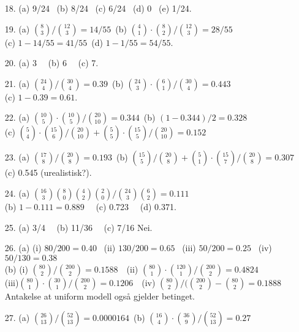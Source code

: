 \begin{itemize}
            (c)  $20\cdot 10!/12! = 5/33$  \ (d)  $12\cdot 10!/12! = 1/11.$
\item[18.]  (a)  9/24  \ (b)  8/24 \  (c)  6/24  \ (d)  0  \ (e)  1/24.
\item[19.]  (a)  ${8\choose 3}/{12\choose 3} = 14/55 $\
            (b)  ${4\choose 1}\cdot {8\choose 2}/{12\choose 3} = 28/55$\\
            (c)  $1-14/55 = 41/55$\    (d)  $1-1/55 = 54/55$.
\item[20.]  (a)  3   \ \ (b)  6 \ \   (c)  7.
\item[21.]  (a)  ${24\choose 4}/{30\choose 4} = 0.39 $\
            (b)  ${24\choose 3}\cdot {6\choose 1}/{30\choose 4} = 0.443$\\
            (c)  $1-0.39 = 0.61$.
\item[22.]  (a)  ${10\choose 5}\cdot {10\choose 5}/{20\choose 10} = 0.344 $\
            (b)  $(1-0.344)/2 = 0.328$\\
            (c) ${5\choose 4}\cdot {15\choose 6}/{20\choose 10} +
                 {5\choose 5}\cdot {15\choose 5}/{20\choose 10} = 0.152 $
\item[23.]  (a)   ${17\choose 8}/{20\choose 8} = 0.193 $\
            (b)   ${15\choose 5}/{20\choose 8} +
                 {5\choose 1}\cdot {15\choose 7}/{20\choose 8} =0.307$\\
            (c)  0.545 (urealistisk?).
\item[24.]  (a)   ${16\choose 3}{8\choose 0}{4\choose 2}{2\choose 0}/
                   {24\choose 3}{6\choose 2} = 0.111$ \\
            (b) $1 - 0.111 = 0.889$ \ \ (c)  0.723 \ \   (d)  0.371.
\item[25.]  (a)  3/4 \ \  (b)  11/36 \ \  (c)  7/16  Nei.
\item[26.]  (a) (i) $80/200=0.40$ \ (ii) $130/200=0.65$ \ (iii) $50/200=0.25$ \
                (iv) $50/130=0.38$ \\
            (b) (i) ${80\choose 2}/{200\choose 2}=0.1588$\ \ 
                (ii) $ {80\choose 1}\cdot {120\choose 1}/{200\choose 2}=0.4824$\\
              (iii)$ {80\choose 1}\cdot {30\choose 1}/{200\choose 2}=0.1206$\ \
                (iv) $ {80\choose 2}/({200\choose 2}-{80\choose 2}=0.1888$\\
                 Antakelse at uniform modell også gjelder betinget.
\item[27.]  (a)    ${26\choose 13}/{52\choose 13} = 0.0000164 $\
            (b)  $  {16\choose 4}\cdot {36\choose 9}/{52\choose 13} = 0.27$\\

\end{itemize}
